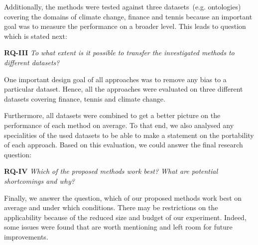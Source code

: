 Additionally, the methods were tested against three datasets~(e.g. ontologies) covering the domains of climate change, finance and tennis because an important goal was to measure the performance on a broader level. This leads to question which is stated next:
 
\textbf{RQ-III} \emph{To what extent is it possible to transfer the investigated methods to different datasets?}

One important design goal of all approaches was to remove any bias to a particular dataset. Hence, all the approaches were evaluated on three different datasets covering finance, tennis and climate change. 

Furthermore, all datasets were combined to get a better picture on the performance of each method on average. To that end, we also analysed any specialities of the used datasets to be able to make a statement on the portability of each approach. Based on this evaluation, we could answer the final research question:

\textbf{RQ-IV} \emph{Which of the proposed methods work best? What are potential shortcomings and why?}

Finally, we answer the question, which of our proposed methods work best on average and under which conditions. There may be restrictions on the applicability because of the reduced size and budget of our experiment. Indeed, some issues were found that are worth mentioning and left room for future improvements. 



